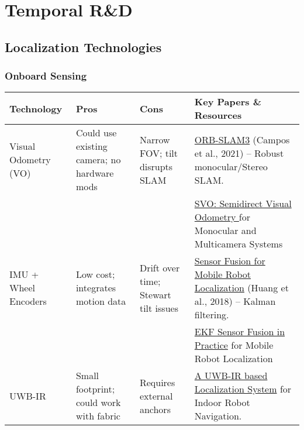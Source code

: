 \chapter{Temporal R\&D}
\label{ch:chapter_one}

\section*{Localization Technologies}

\subsection*{Onboard Sensing}
\begin{table}[H]
    \centering
    \begin{tabular}{|>{\raggedright\arraybackslash}p{3cm}|>{\raggedright\arraybackslash}p{3cm}|>{\raggedright\arraybackslash}p{3cm}|>{\raggedright\arraybackslash}p{5cm}|}
        \hline
        \textbf{Technology} & \textbf{Pros} & \textbf{Cons} & \textbf{Key Papers \& Resources} \\ \hline

        Visual Odometry (VO) & Could use existing camera; no hardware mods& Narrow FOV; tilt disrupts SLAM & \href{https://arxiv.org/abs/2007.11898}{ORB-SLAM3} (Campos et al., 2021) – Robust monocular/Stereo SLAM. \\ 
         & & & \href{https://ieeexplore.ieee.org/document/7782863}{SVO: Semidirect Visual Odometry } for Monocular and Multicamera Systems \\ \hline
  
        IMU + Wheel Encoders & Low cost; integrates motion data & Drift over time; Stewart tilt issues & \href{https://www.researchgate.net/publication/356744906_Sensor_Fusion_for_Mobile_Robot_Localization_Using_Extended_Kalman_Filter_UWB_ToF_and_ArUco_Markers}{Sensor Fusion for Mobile Robot Localization} (Huang et al., 2018) – Kalman filtering. \\ 
         & & & \href{https://thesai.org/Downloads/Volume13No2/Paper_4-Extended_Kalman_Filter_Sensor_Fusion_in_Practice.pdf}{EKF Sensor Fusion in Practice}  for Mobile Robot Localization \\ \hline
         
        UWB-IR & Small footprint; could work with fabric & Requires external anchors & \href{https://ieeexplore.ieee.org/abstract/document/4380919}{A UWB-IR based Localization System} for Indoor Robot Navigation. \\ \hline
    \end{tabular}
\end{table}



